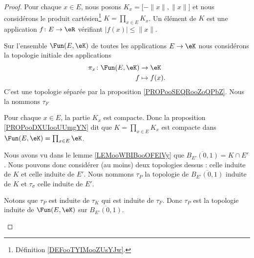 \begin{proof}
	Pour chaque \( x\in E\), nous posons \( K_x=\mathopen[ -\| x \|,\| x \|\mathclose]\) et nous considérons le produit cartésien\footnote{Définition \ref{DEFooTYIMooZUsYJw}.} \( K=\prod_{x\in E}K_x\). Un élément de \( K\) est une application \(f \colon E\to \eR  \) vérifiant \( | f(x) |\leq \| x \|\).

	\begin{subproof}
		Sur l'ensemble \( \Fun(E,\eK)\) de toutes les applications \( E\to \eK\) nous considérons la topologie initiale des applications
		\begin{equation}
			\begin{aligned}
				\pi_x\colon \Fun(E,\eK) & \to \eK       \\
				f                       & \mapsto f(x).
			\end{aligned}
		\end{equation}
		C'est une topologie séparée par la proposition \ref{PROPooSEQRooZoQPbZ}. Nous la nommons \( \tau_F\)

		Pour chaque \( x\in E\), la partie \( K_x\) est compacte. Donc la proposition \ref{PROPooDXUIooUUmgYN} dit que \( K=\prod_{x\in E}K_x\) est compacte dans \( \Fun(E,\eK)=\prod_{x\in E}\eK\).

		Nous avons vu dans le lemme \ref{LEMooWBIBooOFElVy} que \( \overline{B_{E'}(0,1)}=K\cap E'\). Nous pouvons donc considérer (au moins) deux topologies dessus : celle induite de \( K\) et celle induite de \( E'\). Nous nommons \( \tau_P\) la topologie de \( \overline{B_{E'}(0,1)}\) induite de \( K\) et \( \tau_{\sigma}\) celle induite de \( E'\).

		Notons que \( \tau_P\) est induite de \( \tau_K\) qui est induite de \( \tau_F\). Donc \( \tau_P\) est la topologie induite de \( \Fun(E,\eK)\) sur \( \overline{B_{E'}(0,1)}\).


\end{subproof}
\end{proof}
